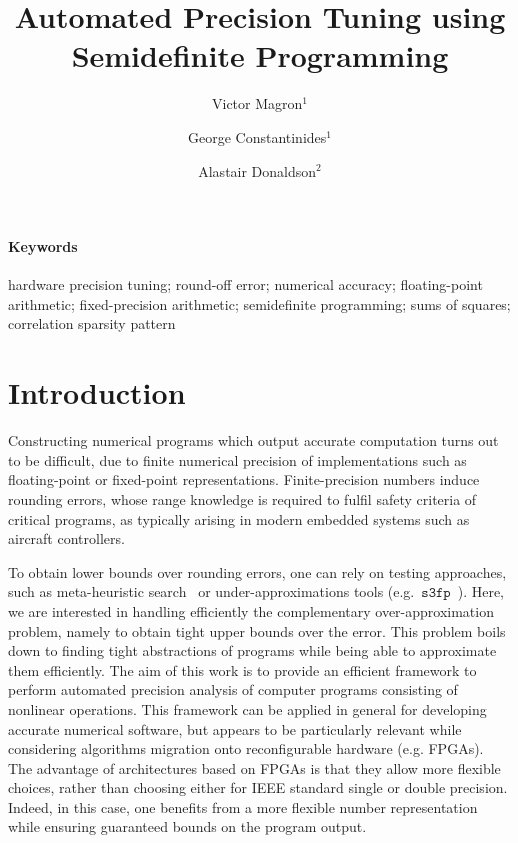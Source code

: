 \documentclass[a4paper,10pt]{article}
\title{\bf Automated Precision Tuning using Semidefinite Programming}
\newcommand{\sthreefp}{\mathtt{s3fp}}
\theoremstyle{plain}
\theoremstyle{definition}
\theoremstyle{remark}
\begin{document}
\author{Victor Magron$^{1}$ \and George Constantinides$^{1}$ \and Alastair Donaldson$^{2}$}


\maketitle

\begin{abstract}



\end{abstract}
\paragraph{Keywords}
hardware precision tuning; round-off error; numerical accuracy; floating-point arithmetic; fixed-precision arithmetic; semidefinite programming; sums of squares; correlation sparsity pattern
\section{Introduction} %
%
Constructing numerical programs which output accurate computation turns out to be difficult, due to finite numerical precision of implementations such as floating-point or fixed-point representations. Finite-precision numbers induce rounding errors, whose range knowledge is required to fulfil safety criteria of critical programs, as typically arising in modern embedded systems such as aircraft controllers.

To obtain lower bounds over rounding errors, one can rely on testing approaches, such as meta-heuristic search~\cite{Borges12Test} or under-approximations tools (e.g.~$\sthreefp$~\cite{Chiang14s3fp}). Here, we are interested in handling efficiently the complementary over-approximation problem, namely to obtain tight upper bounds over the error. This problem boils down to finding tight abstractions of programs while being able to approximate them efficiently. 
The aim of this work is to provide an efficient framework to perform automated precision analysis of computer programs consisting of nonlinear operations. 
%
This framework can be applied in general for developing accurate numerical software, but appears to be particularly relevant while considering algorithms migration onto reconfigurable hardware (e.g. FPGAs). The advantage of architectures based on FPGAs is that they allow more flexible choices, rather than choosing either for IEEE standard single or double precision. Indeed, in this case, one benefits from a more flexible number representation while ensuring guaranteed bounds on the program output. 
\end{document}
